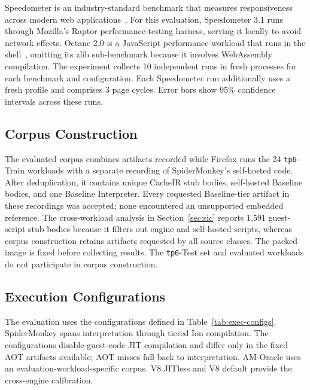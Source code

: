 \documentclass[sigplan,screen,review,anonymous]{acmart}
\newcommand{\tpsixtrain}{24}
\newcommand{\spPageCycles}{3}
\newcommand{\interICtrainCount}{1{,}591}
\newcommand{\AM}{\leavevmode{\sc AmberMonkey}}
\newcommand{\AMoracle}{AM-Oracle}
\begin{document}
Speedometer is an industry-standard benchmark that measures responsiveness across modern web applications~\cite{browserbench2024speedometer3}. For this evaluation, Speedometer 3.1 runs through Mozilla's Raptor performance-testing harness, serving it locally to avoid network effects. Octane 2.0 is a JavaScript performance workload that runs in the shell~\cite{chromium2013octane2}, omitting its zlib sub-benchmark because it involves WebAssembly compilation. The experiment collects 10 independent runs in fresh processes for each benchmark and configuration. Each Speedometer run additionally uses a fresh profile and comprises \spPageCycles{} page cycles. Error bars show 95\% confidence intervals across these runs.

\subsection{Corpus Construction}

The evaluated corpus combines artifacts recorded while Firefox runs the \tpsixtrain{} {\tt tp6}-Train workloads with a separate recording of SpiderMonkey's self-hosted code. After deduplication, it contains \icstubcount{} unique CacheIR stub bodies, \selfhostedcount{} self-hosted Baseline bodies, and one Baseline Interpreter. Every requested Baseline-tier artifact in these recordings was accepted; none encountered an unsupported embedded reference. The cross-workload analysis in Section~\ref{sec:sic} reports \interICtrainCount{} guest-script stub bodies because it filters out engine and self-hosted scripts, whereas corpus construction retains artifacts requested by all source classes. The packed image is fixed before collecting results. The {\tt tp6}-Test set and evaluated workloads do not participate in corpus construction.

\subsection{Execution Configurations}

The evaluation uses the configurations defined in Table~\ref{tab:exec-configs}. SpiderMonkey spans interpretation through tiered Ion compilation. The \AM{} configurations disable guest-code JIT compilation and differ only in the fixed AOT artifacts available; AOT misses fall back to interpretation. \AMoracle{} uses an evaluation-workload-specific corpus. V8 JITless and V8 default provide the cross-engine calibration.
\end{document}
